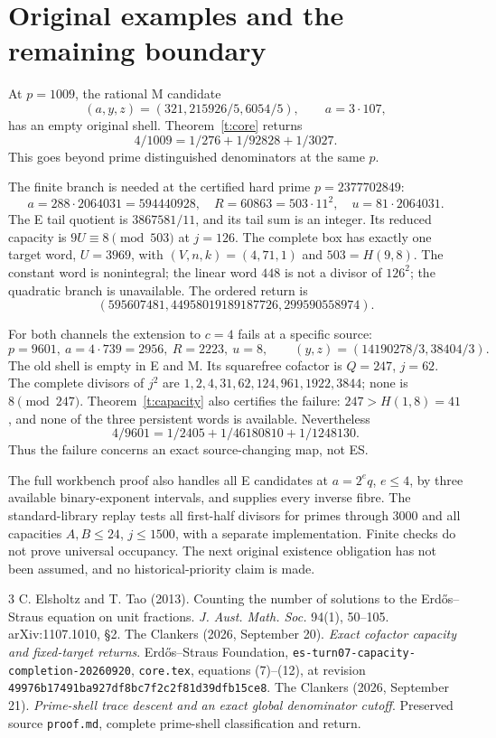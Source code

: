 \documentclass[10pt,reqno]{amsart}
\begin{document}
\section{Original examples and the remaining boundary}
At $p=1009$, the rational M candidate
\[
 (a,y,z)=(321,215926/5,6054/5),\qquad a=3\cdot107,
\]
has an empty original shell. Theorem~\ref{t:core} returns
\[
 4/1009=1/276+1/92828+1/3027.
\]
This goes beyond prime distinguished denominators at the same $p$.

The finite branch is needed at the certified hard prime $p=2377702849$:
\[
 a=288\cdot2064031=594440928,\quad R=60863=503\cdot11^2,
 \quad u=81\cdot2064031.
\]
The E tail quotient is $3867581/11$, and its tail sum is an integer.
Its reduced capacity is $9U\equiv8\pmod{503}$ at $j=126$. The complete box
has exactly one target word, $U=3969$, with $(V,n,k)=(4,71,1)$ and
$503=H(9,8)$. The constant word is nonintegral; the linear word $448$ is not a
divisor of $126^2$; the quadratic branch is unavailable. The ordered return is
\[
 (595607481,44958019189187726,299590558974).
\]

For both channels the extension to $c=4$ fails at a specific source:
\[
 p=9601,\ a=4\cdot739=2956,\ R=2223,\ u=8,\qquad
 (y,z)=(14190278/3,38404/3).
\]
The old shell is empty in E and M. Its squarefree cofactor is $Q=247$, $j=62$.
The complete divisors of $j^2$ are
$1,2,4,31,62,124,961,1922,3844$; none is $8\pmod{247}$. Theorem~\ref{t:capacity}
also certifies the failure: $247>H(1,8)=41$, and none of the three persistent
words is available. Nevertheless
\[
 4/9601=1/2405+1/46180810+1/1248130.
\]
Thus the failure concerns an exact source-changing map, not ES.

The full workbench proof also handles all E candidates at $a=2^e q$, $e\le4$,
by three available binary-exponent intervals, and supplies every inverse fibre.
The standard-library replay tests all first-half divisors for primes through
3000 and all capacities $A,B\le24$, $j\le1500$, with a separate implementation.
Finite checks do not prove universal occupancy. The next original existence
obligation has not been assumed, and no historical-priority claim is made.

\begin{thebibliography}{3}
 C. Elsholtz and T. Tao (2013).
Counting the number of solutions to the Erd\H{o}s--Straus equation on unit fractions.
\emph{J. Aust. Math. Soc.} 94(1), 50--105. arXiv:1107.1010, \S2.
 The Clankers (2026, September 20).
\emph{Exact cofactor capacity and fixed-target returns}.
Erd\H{o}s--Straus Foundation, \texttt{es-turn07-capacity-completion-20260920},
\texttt{core.tex}, equations (7)--(12), at revision
\texttt{49976b17491ba927df8bc7f2c2f81d39dfb15ce8}.
 The Clankers (2026, September 21).
\emph{Prime-shell trace descent and an exact global denominator cutoff}.
Preserved source \texttt{proof.md}, complete prime-shell classification and return.
\end{thebibliography}
\end{document}
